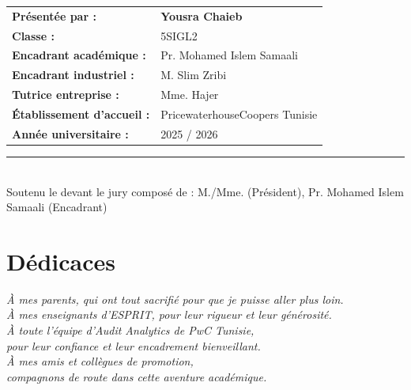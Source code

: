 \documentclass[12pt,a4paper,twoside]{report}
\theoremstyle{definition}
\begin{document}
\begin{titlepage}
\begin{center}
\begin{tabular}{ll}
  \textbf{Présentée par :} & \textbf{Yousra Chaieb} \\[4pt]
  \textbf{Classe :}        & 5SIGL2 \\[4pt]
  \textbf{Encadrant académique :} & Pr. Mohamed Islem Samaali \\[4pt]
  \textbf{Encadrant industriel :} & M. Slim Zribi \\[4pt]
  \textbf{Tutrice entreprise :}   & Mme. Hajer \\[4pt]
  \textbf{Établissement d'accueil :} & PricewaterhouseCoopers Tunisie \\[4pt]
  \textbf{Année universitaire :}  & 2025 / 2026 \\
\end{tabular}
\end{center}

\vfill
\begin{center}
  {\color{pwcorange}\rule{12cm}{1.5pt}}\\[4pt]
  {\small\color{pwcgray}
    Soutenu le \underline{\hspace{3cm}} devant le jury composé de :
    M./Mme. \underline{\hspace{4cm}} (Président),
    Pr. Mohamed Islem Samaali (Encadrant)}
\end{center}
\end{titlepage}

\setcounter{page}{1}
\pagestyle{plain}

\chapter*{Dédicaces}
\begin{center}
  \vspace*{2cm}
  {\itshape
    À mes parents, qui ont tout sacrifié pour que je puisse aller plus loin.\\[12pt]
    À mes enseignants d'ESPRIT, pour leur rigueur et leur générosité.\\[12pt]
    À toute l'équipe d'Audit Analytics de PwC Tunisie,\\
    pour leur confiance et leur encadrement bienveillant.\\[12pt]
    À mes amis et collègues de promotion,\\
    compagnons de route dans cette aventure académique.
  }
\end{center}
\end{document}
